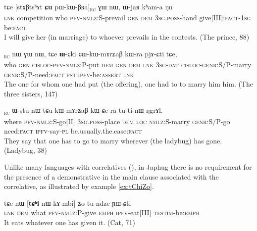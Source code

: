 \documentclass[oldfontcommands,oneside,a4paper,11pt]{article}
\newcommand{\ipa}[1]{{\phon #1}} %
\newcommand{\topic}{\textsc{dem}}
\newcommand{\rc}{\textsubscript{\textsc{rc}}}
\begin{document}
  \begin{exe}
\ex \label{ex:pWkWBRa}
\gll
\ipa{tɕe}  	[\ipa{stɤβtsʰɤt}  	\textbf{\ipa{ɕu}}   	\ipa{pɯ-kɯ-βʁa}]\rc{}  	\ipa{ɣɯ}  	\ipa{nɯ},  	\ipa{\textbf{ɯ}-jaʁ}  	\ipa{kʰam-a}  	\ipa{ŋu}  \\
\textsc{lnk}  competition who \textsc{pfv-nmlz:}S-prevail \textsc{gen} \textsc{dem} \textsc{3sg.poss}-hand give[III]:\textsc{fact}-\textsc{1sg} be:\textsc{fact} \\
\glt I will give her (in marriage) to whoever prevails in the contests.  (The prince, 88)
\end{exe}




\begin{exe}
\ex \label{ex:CthWkAta}
\gll
[\textbf{\ipa{ɕu}}   	\ipa{ɣɯ}  	\ipa{ɕ-tʰɯ-kɤ-ta}]\rc{}  	\ipa{nɯ}  	\ipa{ɣɯ}  	\ipa{nɯ,}  	\ipa{tɕe}  	\ipa{\textbf{ɯ}-ɕki}  	\ipa{ɕɯ-kɯ-mɤrʑaβ}  	\ipa{kɯ-ra}  	\ipa{pjɤ-ɕti}  	\ipa{tɕe,}  \\
who \textsc{gen} \textsc{cisloc-pfv-nmlz:P}-put \topic{} \textsc{gen} \topic{} \textsc{lnk}
\textsc{3sg}-\textsc{dat} \textsc{cisloc-genr:S/P}-marry \textsc{genr:S/P-}need:\textsc{fact} \textsc{pst.ipfv}-be:\textsc{assert} \textsc{lnk} \\
\glt The one for whom one had put (the offering), one had to to marry him him. (The three sisters, 147)
\end{exe} 


\begin{exe}
\ex \label{ex:jAkAri}
\gll
[\textbf{\ipa{ŋotɕu}}  	\ipa{jɤ-kɯ-ɤri}]\rc{} 	\ipa{ɯ-stu}  	\ipa{nɯ}  	\ipa{tɕu}  	\ipa{kɯ-mɤrʑaβ}  	\ipa{kɯ-ɕe}  	\ipa{ra}  	\ipa{tu-ti-nɯ}  	\ipa{ŋgrɤl.} \\
where \textsc{pfv-nmlz:S}-go[II] \textsc{3sg.poss}-place \topic{} \textsc{loc} \textsc{nmlz:S}-marry \textsc{genr:S/P}-go need:\textsc{fact} \textsc{ipfv}-say-\textsc{pl} be.usually.the.case:\textsc{fact} \\
\glt They say that one has to go to marry wherever (the ladybug) has gone. (Ladybug, 38)
\end{exe} 

Unlike many languages with correlatives   (\citealt{dayal96quantification}), in Japhug there is no requirement for the presence of a demonstrative  in the main clause  associated with the correlative, as illustrated by example  \ref{ex:tChiZo}.
 

\begin{exe}
\ex \label{ex:tChiZo}
\gll
\ipa{tɕe}  	\ipa{nɯ}  	[\textbf{\ipa{tɕʰi}}  	\ipa{nɯ-kɤ-mbi}]  	\ipa{ʑo}  	\ipa{tu-ndze}  	\ipa{ɲɯ-ɕti}  \\
\textsc{lnk} \textsc{dem} what \textsc{pfv-nmlz:P}-give \textsc{emph} \textsc{ipfv}-eat[III] \textsc{testim}-be:\textsc{emph} \\
\glt It eats whatever one has given it. (Cat, 71)
\end{exe}
\end{document}
